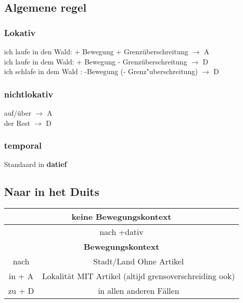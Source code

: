 \documentclass[main.tex]{subfiles}
\begin{document}
\subsection{Algemene regel}
\subsubsection{Lokativ}
ich laufe in den Wald: + Bewegung + Grenzüberschreitung $\rightarrow$ A\\
ich laufe in dem Wald: + Bewegung - Grenzüberschreitung $\rightarrow$ D\\
ich schlafe in dem Wald : -Bewegung (- Grenz"uberschreitung) $\rightarrow$ D
\subsubsection{nichtlokativ}
auf/über $\rightarrow$ A\\
der Rest $\rightarrow$ D
\subsubsection{temporal}
Standaard in \textbf{datief}\\


\subsection{Naar in het Duits}
\begin{tabular}{| c | c | c | c |}
\hline
\multicolumn{4}{|c|}{\textbf{keine Bewegungskontext}}\\
\hline
\multicolumn{4}{|c|}{nach +dativ}\\
\hline
\hline
\multicolumn{4}{|c|}{\textbf{Bewegungskontext}}\\
\hline
nach & \multicolumn{3}{|c|}{Stadt/Land Ohne Artikel}\\
\hline
in + A & \multicolumn{3}{|c|}{Lokalität MIT Artikel (altijd grensoverschreiding ook)}\\
\hline
zu + D & \multicolumn{3}{|c|}{in allen anderen Fällen}\\
\hline
\end{tabular}
\end{document}

